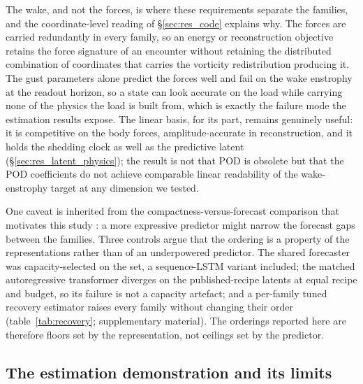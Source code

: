 The wake, and not the forces, is where these requirements separate the families, and the coordinate-level reading of \S\ref{sec:res_code} explains why. The forces are carried redundantly in every family, so an energy or reconstruction objective retains the force signature of an encounter without retaining the distributed combination of coordinates that carries the vorticity redistribution producing it. The gust parameters alone predict the forces well and fail on the wake enstrophy at the readout horizon, so a state can look accurate on the load while carrying none of the physics the load is built from, which is exactly the failure mode the estimation results expose. The linear basis, for its part, remains genuinely useful: it is competitive on the body forces, amplitude-accurate in reconstruction, and it holds the shedding clock as well as the predictive latent (\S\ref{sec:res_latent_physics}); the result is not that POD is obsolete but that the POD coefficients do not achieve comparable linear readability of the wake-enstrophy target at any dimension we tested.\re

One caveat is inherited from the compactness-versus-forecast comparison that motivates this study \citep{solerarico_compactness_underreview}: a more expressive predictor might narrow the forecast gaps between the families. Three controls argue that the ordering is a property of the representations rather than of an underpowered predictor. The shared forecaster was capacity-selected on the \ValSplit{} set, a sequence-LSTM variant included; the matched autoregressive transformer diverges on the published-recipe latents at equal recipe and budget, so its failure is not a capacity artefact; and a per-family tuned recovery estimator raises every family without changing their order (table~\ref{tab:recovery}; supplementary material). The orderings reported here are therefore floors set by the representation, not ceilings set by the predictor.\re

\subsection{The estimation demonstration and its limits}
\label{sec:disc_estimation}

